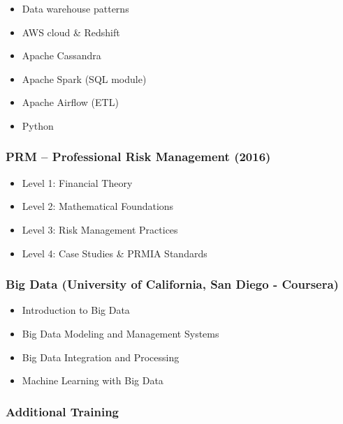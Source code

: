 \begin{itemize}
\tightlist
\item
  Data warehouse patterns
\item
  AWS cloud \& Redshift
\item
  Apache Cassandra
\item
  Apache Spark (SQL module)
\item
  Apache Airflow (ETL)
\item
  Python
\end{itemize}

\subsubsection{\texorpdfstring{\textbf{PRM -- Professional Risk
Management}
(2016)}{PRM -- Professional Risk Management (2016)}}\label{prm-professional-risk-management-2016}

\begin{itemize}
\tightlist
\item
  Level 1: Financial Theory
\item
  Level 2: Mathematical Foundations
\item
  Level 3: Risk Management Practices
\item
  Level 4: Case Studies \& PRMIA Standards
\end{itemize}

\subsubsection{\texorpdfstring{\textbf{Big Data} (University of
California, San Diego -
Coursera)}{Big Data (University of California, San Diego - Coursera)}}\label{big-data-university-of-california-san-diego---coursera}

\begin{itemize}
\tightlist
\item
  Introduction to Big Data
\item
  Big Data Modeling and Management Systems
\item
  Big Data Integration and Processing
\item
  Machine Learning with Big Data
\end{itemize}

\subsubsection{\texorpdfstring{\textbf{Additional
Training}}{Additional Training}}\label{additional-training}

